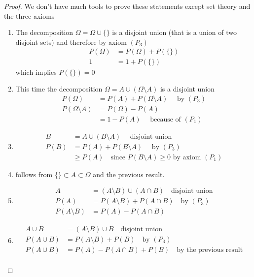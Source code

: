 \documentclass[twoside,11pt,a4paper]{article}
\newif\ifEN \ENtrue	                %
\def\tr|#1|#2|{\ifEN #2\else #1\fi}     %
\theoremstyle{definition}
\newcounter{exc}
\begin{document}
\begin{proof}
  \tr|Wir haben nicht viel zur Hand, was wir brauchen könnten um  diese Aussagen beweisen zu können, ausser Mengenlehre und die obigen Axiome.
  |We don't have much tools to prove these statements except set theory and the three axioms|
  \begin{enumerate}
  \item 
    \tr|Die Zerlegung $\Omega=\Omega\cup\{\}$ ist disjunkt (d.h. ein Vereinigung zweier disjunkter Mengen) und deshalb gilt nach Axiom $(P_3)$ 
    |The decomposition $\Omega=\Omega\cup\{\}$ is a disjoint union  (that is a union of two disjoint sets) and therefore by axiom $(P_3)$| 
    \begin{align*}
      P(\Omega)&=P(\Omega)+P(\{\})\\
      1&=1+P(\{\})
    \end{align*}
    \tr|und daraus folgt | which implies | $P(\{\})=0$
  \item
    \tr|Dieses Mal ist die Zerlegung | This time the decomposition | $\Omega=A\cup (\Omega\setminus A)$ \tr|disjunkt | is a disjoint union|
    \begin{align*}
      P(\Omega)&=P(A)+P(\Omega\setminus A)\quad\text{\tr|nach | by | $(P_3)$} \\
      P(\Omega\setminus A)&=P(\Omega)-P(A)\\
               &=1-P(A) \quad\text{\tr|nach $(P)1$)| because of $(P_1)$|}
    \end{align*}
  \item 
    \begin{align*}
      B&=A\cup (B\setminus A )\quad\text{ \tr|disjunkte Vereinigung|disjoint union|}\\
      P(B)&=P(A)+P(B\setminus A)\quad\text{\tr|nach | by | $(P_3)$} \\
       &\geq P(A) \quad\text{\tr|weil |since | $P(B\setminus A)\geq 0$ \tr|wegen |by axiom | $(P_1)$}				
    \end{align*}
  \item \tr|folgt aus |follows from | $\{\}\subset A\subset \Omega$  \tr|und dem letzten Resultat. |and the previous result.|
  \item 
    \begin{align*}
      A&=(A\setminus B)\cup(A\cap B)\quad\text{\tr|disjunkte Vereinigung|disjoint union|}\\			
      P(A)&=P(A\setminus B)+P(A\cap B)\quad\text{\tr|wegen |by | $(P_3)$}\\			
      P(A\setminus B)&=P(A)-P(A\cap B)
    \end{align*}
  \item 
    \begin{align*}
      A\cup B&=(A\setminus B)\cup B\quad\text{\tr|disjunkte Vereinigung|disjoint union|}\\			
      P(A\cup B)&=P(A\setminus B)+P(B)\quad\text{by $(P_3)$}\\			
      P(A\cup B)&=P(A)-P(A\cap B)+P(B)\quad\text{\tr|wegen dem letzen Resultat|by the previous result|}\\			
    \end{align*}
  \end{enumerate}
\end{proof}
\end{document}
